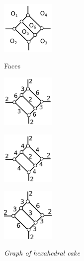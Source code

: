 \documentclass[dvipdfmx]{interact}
\theoremstyle{plain}%
\theoremstyle{definition}
\theoremstyle{remark}
\theoremstyle{problemstyle}
\begin{document}
\begin{figure}[h!tbp]
  \begin{minipage}[t]{0.23\textwidth}
   \centering
   \includegraphics[width=1in, keepaspectratio]{./img/HexahedraWithSphericalFaces/hexahedralCake/hexahedralCakeFaces.png}
   \caption{Faces}
   \label{fig:}
  \end{minipage}
 \hspace*{\fill}
 \begin{minipage}[t]{0.69\textwidth}
  \begin{minipage}[t]{0.23\textwidth}
   \centering
   \includegraphics[width=1in,
   keepaspectratio]{./img/HexahedraWithSphericalFaces/hexahedralCake/hexahedralCake_a.png}
   \subcaption{}
   \label{fig:}
  \end{minipage}
  \hspace*{\fill}
  \begin{minipage}[t]{0.23\textwidth}
   \centering
   \includegraphics[width=1in, keepaspectratio]{./img/HexahedraWithSphericalFaces/hexahedralCake/hexahedralCake_b.png}
   \subcaption{}
   \label{}
  \end{minipage}
 \hspace*{\fill}
  \begin{minipage}[t]{0.23\textwidth}
   \centering
   \includegraphics[width=1in, keepaspectratio]{./img/HexahedraWithSphericalFaces/hexahedralCake/hexahedralCake_c.png}
   \subcaption{}
   \label{fig:}
  \end{minipage}
 \hspace*{\fill}
  \caption{\textit{Graph of hexahedral cake}}
  \label{fig:}
 \end{minipage}
\end{figure}
\end{document}
